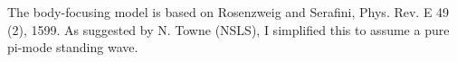 The body-focusing model is based on Rosenzweig and Serafini, Phys. Rev. E 49 (2),
1599.  As suggested by N. Towne (NSLS), I simplified this to assume a pure pi-mode
standing wave.


